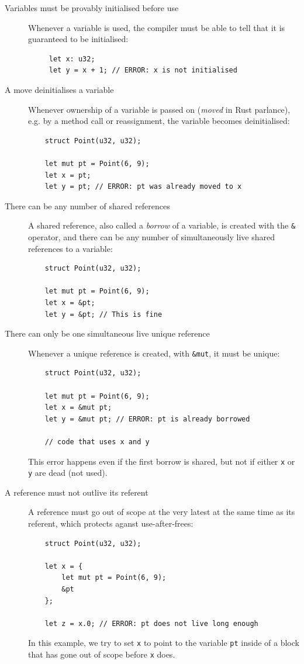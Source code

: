 \documentclass[11pt,a4paper,twoside,openany]{report}
\newcommand{\InRust}[1]{\texttt{#1}}
\begin{document}
\begin{description}  
\item[Variables must be provably initialised before use] Whenever a variable is
  used, the compiler must be able to tell that it is guaranteed to be
  initialised:
  \begin{verbatim}
     let x: u32;
     let y = x + 1; // ERROR: x is not initialised
  \end{verbatim}
\item[A move deinitialises a variable] Whenever ownership of a variable is
  passed on (\emph{moved} in Rust parlance), e.g. by a method call or
  reassignment, the variable becomes deinitialised:
  \begin{verbatim}
    struct Point(u32, u32);
    
    let mut pt = Point(6, 9);
    let x = pt;
    let y = pt; // ERROR: pt was already moved to x
  \end{verbatim}
\item[There can be any number of shared references] A shared reference, also
  called a \textit{borrow} of a variable, is created with the \InRust{&}
  operator, and there can be any number of simultaneously live shared references
  to a variable:
  \begin{verbatim}
    struct Point(u32, u32);
    
    let mut pt = Point(6, 9);
    let x = &pt;
    let y = &pt; // This is fine
  \end{verbatim}
\item[There can only be one simultaneous live unique reference] Whenever a
  unique reference is created, with \InRust{&mut}, it must be unique:
  \begin{verbatim}
    struct Point(u32, u32);
    
    let mut pt = Point(6, 9);
    let x = &mut pt;
    let y = &mut pt; // ERROR: pt is already borrowed
    
    // code that uses x and y
  \end{verbatim}

  This error happens even if the first borrow is shared, but not if
  either \InRust{x} or \InRust{y} are dead (not used).
  
\item[A reference must not outlive its referent] A reference must go out of
  scope at the very latest at the same time as its referent, which protects
  aganst use-after-frees:
  \begin{verbatim}
    struct Point(u32, u32);
    
    let x = {
        let mut pt = Point(6, 9);
        &pt
    };
    
    let z = x.0; // ERROR: pt does not live long enough
  \end{verbatim}

  In this example, we try to set \InRust{x} to point to the variable \InRust{pt}
  inside of a block that has gone out of scope before \InRust{x} does.
\end{description}
\end{document}
